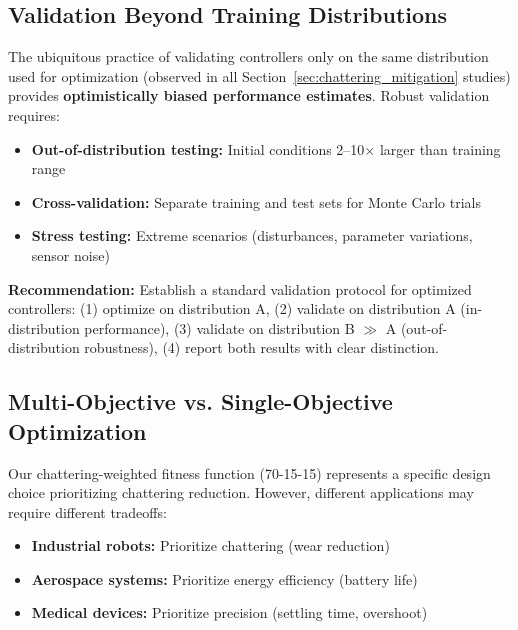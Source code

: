 \subsection{Validation Beyond Training Distributions}
\label{subsec:validation_practices}

The ubiquitous practice of validating controllers only on the same distribution used for optimization (observed in all Section~\ref{sec:chattering_mitigation} studies) provides \textbf{optimistically biased performance estimates}. Robust validation requires:
\begin{itemize}
    \item \textbf{Out-of-distribution testing:} Initial conditions 2--10$\times$ larger than training range
    \item \textbf{Cross-validation:} Separate training and test sets for Monte Carlo trials
    \item \textbf{Stress testing:} Extreme scenarios (disturbances, parameter variations, sensor noise)
\end{itemize}

\textbf{Recommendation:} Establish a standard validation protocol for optimized controllers: (1) optimize on distribution A, (2) validate on distribution A (in-distribution performance), (3) validate on distribution B $\gg$ A (out-of-distribution robustness), (4) report both results with clear distinction.

\subsection{Multi-Objective vs. Single-Objective Optimization}
\label{subsec:pareto_fronts}

Our chattering-weighted fitness function (70-15-15) represents a specific design choice prioritizing chattering reduction. However, different applications may require different tradeoffs:
\begin{itemize}
    \item \textbf{Industrial robots:} Prioritize chattering (wear reduction)
    \item \textbf{Aerospace systems:} Prioritize energy efficiency (battery life)
    \item \textbf{Medical devices:} Prioritize precision (settling time, overshoot)
\end{itemize}

